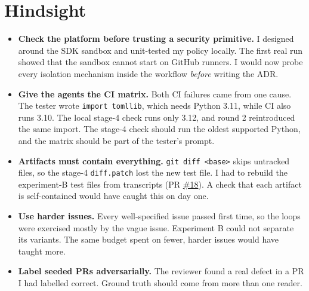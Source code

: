 \documentclass[11pt,a4paper]{article}
\newcommand{\gh}[1]{\href{https://github.com/iDheer/tinydb/#1}}
\begin{document}
\section{Hindsight}
\begin{itemize}
\item \textbf{Check the platform before trusting a security primitive.} I designed around the SDK
sandbox and unit-tested my policy locally. The first real run showed that the sandbox cannot start on
GitHub runners. I would now probe every isolation mechanism inside the workflow \emph{before} writing
the ADR.
\item \textbf{Give the agents the CI matrix.} Both CI failures came from one cause. The tester wrote
\texttt{import tomllib}, which needs Python 3.11, while CI also runs 3.10. The local stage-4 check runs
only 3.12, and round 2 reintroduced the same import. The stage-4 check should run the oldest
supported Python, and the matrix should be part of the tester's prompt.
\item \textbf{Artifacts must contain everything.} \texttt{git diff <base>} skips untracked files,
so the stage-4 \texttt{diff.patch} lost the new test file. I had to rebuild the experiment-B test
files from transcripts (PR \gh{pull/18}{\#18}). A check that each artifact is self-contained would
have caught this on day one.
\item \textbf{Use harder issues.} Every well-specified issue passed first time, so the loops were
exercised mostly by the vague issue. Experiment B could not separate its variants. The same budget
spent on fewer, harder issues would have taught more.
\item \textbf{Label seeded PRs adversarially.} The reviewer found a real defect in a PR I had labelled
correct. Ground truth should come from more than one reader.
\end{itemize}
\end{document}

